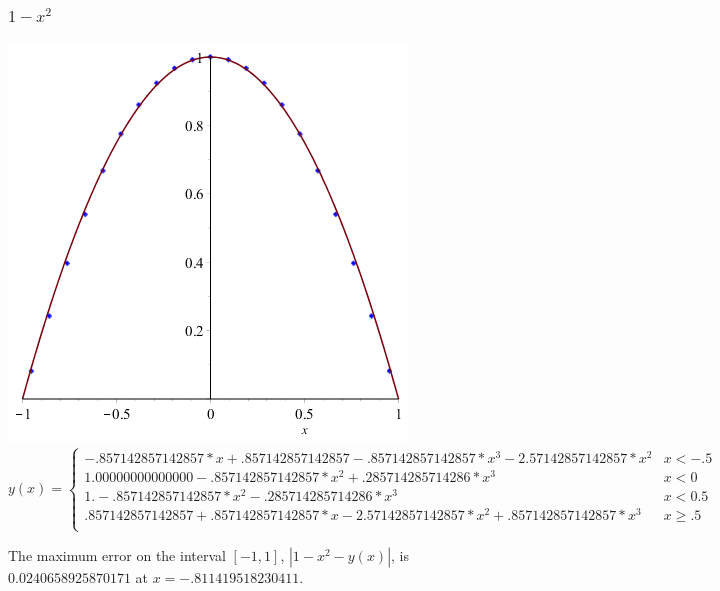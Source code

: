 \documentclass[11pt]{article} %
\begin{document}
\subsubsection*{$1-x^2$}
\includegraphics[scale=.3]{plots/dataset3approx.png}
$$
y(x) = \left\{
        \begin{array}{ll}
            -.857142857142857*x+.857142857142857-.857142857142857*x^3-2.57142857142857*x^2 &  x < -.5 \\
           1.00000000000000-.857142857142857*x^2+.285714285714286*x^3 & x < 0 \\
 	1.-.857142857142857*x^2-.285714285714286*x^3 &  x < 0.5 \\
 	.857142857142857+.857142857142857*x-2.57142857142857*x^2+.857142857142857*x^3 &  x \geq .5 \\
        \end{array}
    \right.
$$

The maximum error on the interval $[-1,1]$, $|1-x^2 - y(x)|$, is $0.0240658925870171$ at $x = -.811419518230411$.
\end{document}
